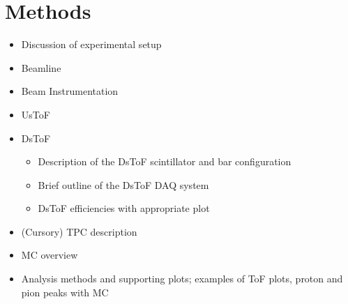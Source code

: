 \section{Methods}
\label{hptpcPaper:sec:Methods}
\begin{itemize}
    \item Discussion of experimental setup
\item Beamline
\item Beam Instrumentation
\item UsToF
\item DsToF
    \begin{itemize}
        \item Description of the DsToF scintillator and bar configuration 
        \item Brief outline of the DsToF DAQ system
        \item DsToF efficiencies with appropriate plot
    \end{itemize}

\item (Cursory) TPC description
\item MC overview
\item Analysis methods and supporting plots; examples of ToF plots, proton and pion peaks with MC

\end{itemize}
